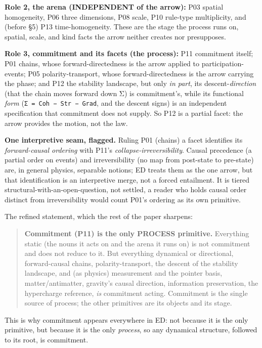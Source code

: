 \documentclass[
  11pt,
]{article}
\begin{document}
\textbf{Role 2, the arena (INDEPENDENT of the arrow):} P03 spatial
homogeneity, P06 three dimensions, P08 scale, P10 rule-type
multiplicity, and (before §5) P13 time-homogeneity. These are the stage
the process runs on, spatial, scale, and kind facts the arrow neither
creates nor presupposes.

\textbf{Role 3, commitment and its facets (the process):} P11 commitment
itself; P01 chains, whose forward-directedness is the arrow applied to
participation-events; P05 polarity-transport, whose forward-directedness
is the arrow carrying the phase; and P12 the stability landscape, but
only \emph{in part}, its descent-\emph{direction} (that the chain moves
forward down Σ) is commitment's, while its functional \emph{form}
(\texttt{Σ\ =\ Coh\ −\ Str\ −\ Grad}, and the descent signs) is an
independent specification that commitment does not supply. So P12 is a
partial facet: the arrow provides the motion, not the law.

\textbf{One interpretive seam, flagged.} Ruling P01 (chains) a facet
identifies its \emph{forward-causal ordering} with P11's
\emph{collapse-irreversibility}. Causal precedence (a partial order on
events) and irreversibility (no map from post-state to pre-state) are,
in general physics, separable notions; ED treats them as the one arrow,
but that identification is an interpretive merge, not a forced
entailment. It is tiered structural-with-an-open-question, not settled,
a reader who holds causal order distinct from irreversibility would
count P01's ordering as its own primitive.

The refined statement, which the rest of the paper sharpens:

\begin{quote}
\textbf{Commitment (P11) is the only PROCESS primitive.} Everything
static (the nouns it acts on and the arena it runs on) is not commitment
and does not reduce to it. But everything dynamical or directional,
forward-causal chains, polarity-transport, the descent of the stability
landscape, and (as physics) measurement and the pointer basis,
matter/antimatter, gravity's causal direction, information preservation,
the hypercharge reference, \emph{is} commitment acting. Commitment is
the single source of process; the other primitives are its objects and
its stage.
\end{quote}

This is why commitment appears everywhere in ED: not because it is the
only primitive, but because it is the only \emph{process}, so any
dynamical structure, followed to its root, is commitment.
\end{document}
